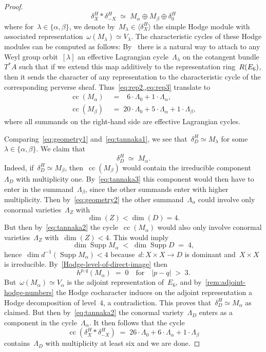 \documentclass[a4paper]{amsart}
\newcommand{\rR}{\textup{R}}
\DeclareMathOperator{\Supp}{Supp}
\DeclareMathOperator{\cc}{cc}
\theoremstyle{plain}
\theoremstyle{definition}
\numberwithin{equation}{section}
\begin{document}
\begin{proof}
%
\begin{equation} \label{eq:tannaka1} \tag{3a}
 \delta_X^H * \delta_{-X}^H \;\simeq\; M_{\alpha} \oplus M_{\beta} \oplus \delta_0^H
\end{equation} 
%
where for~$\lambda \in \{\alpha, \beta\}$, we denote by~$M_\lambda \in \langle \delta_X^H\rangle$ the simple Hodge module with associated representation~$\omega(M_\lambda) \simeq V_\lambda$. The characteristic cycles of these Hodge modules can be computed as follows: By~\cite[th.~5.11, lemma~5.14]{JKLM} there is a natural way to attach to any Weyl group orbit~$[\lambda]$ an effective Lagrangian cycle~$\Lambda_{\lambda}$
%
on the cotangent bundle~$T^* A$ such that if we extend this map additively to the representation ring~$\rR(E_6)$, then it sends the character of any representation to the characteristic cycle of the corresponding perverse sheaf.
Thus~\cref{eq:rep2,,eq:rep3} translate to
%
\begin{align} \label{eq:tannaka2} \tag{3b}
 \cc(M_{\alpha}) &\;=\;\phantom{0}6\cdot \Lambda_0 + 1 \cdot \Lambda_{\alpha} , \\ \label{eq:tannaka3} \tag{3c}
 \cc(M_{\beta}) &\;=\; 20 \cdot \Lambda_0 + 5\cdot \Lambda_{\alpha} + 1 \cdot \Lambda_{\beta} ,
\end{align}
%
where all summands on the right-hand side are effective Lagrangian cycles. 

\medskip 

Comparing~\cref{eq:geometry1} and~\cref{eq:tannaka1}, we see that~$\delta_D^H\simeq M_\lambda$ for some~$\lambda \in \{\alpha, \beta\}$. We claim that 
%
\[
  \delta_D^H \;\simeq\; M_{\alpha}. 
\] 
%
Indeed, if~$\delta_D^H \simeq M_{\beta}$, then~$\cc(M_\beta)$ would contain the irreducible component~$\Lambda_D$ with multiplicity one. By~\cref{eq:tannaka3} this component would then have to enter in the summand~$\Lambda_{\beta}$, since the other summands enter with higher multiplicity. Then by~\cref{eq:geometry2} the other summand~$\Lambda_{\alpha}$ could involve only conormal varieties~$\Lambda_Z$ with \[\dim(Z)<\dim(D)=4.\] But then by~\cref{eq:tannaka2} the cycle~$\cc(M_{\alpha})$ would also only involve conormal varieties~$\Lambda_Z$ with~$\dim(Z)<4$. This would imply
%
\[
 \dim \Supp M_{\alpha} \;<\; \dim \Supp D \;=\; 4,
\]
hence~$\dim d^{-1}(\Supp M_{\alpha}) < 4$ because~$d \colon X\times X \to D$ is dominant and~$X\times X$ is irreducible. By~\cref{Hodge-level-of-direct-image} then
%
\[
 h^{p,q}(M_{\alpha}) \;=\; 0 \quad \text{for} \quad |p-q| \;>\; 3.
\]
%
But~$\omega(M_\alpha)\simeq V_\alpha$ is the adjoint representation of~$E_6$, and by~\cref{rem:adjoint-hodge-numbers} the Hodge cocharacter induces on the adjoint representation a Hodge decomposition of level~$4$, a contradiction. This proves that~$\delta_D^H\simeq M_{\alpha}$ as claimed. But then by~\cref{eq:tannaka2} the conormal variety~$\Lambda_D$ enters as a component in the cycle~$\Lambda_{\alpha}$. It then follows that the cycle
%
\[ \cc(\delta_X^H * \delta_{-X}^H) \;=\; 26\cdot \Lambda_0 + 6\cdot \Lambda_{\alpha} + 1 \cdot \Lambda_\beta
\]
%
contains~$\Lambda_D$ with multiplicity at least six and we are done.
\end{proof}
\end{document}
